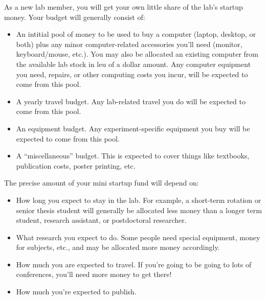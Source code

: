 \documentclass{tufte-book} %
\begin{document}
As a new lab member, you will get your own little share of the lab's
startup money.    Your budget will
generally consist of:
\begin{itemize}
\item An intitial pool of money to be used to buy a computer (laptop,
  desktop, or both) plus any minor computer-related accessories you'll
  need (monitor, keyboard/mouse, etc.).  You may also be allocated an
  existing computer from the available lab stock in leu of a dollar amount.  Any computer
  equipment you need, repairs, or other computing costs you incur,
  will be expected to come from this pool.
\item A yearly travel budget.  Any lab-related travel you do will be
  expected to come from this pool.
\item An equipment budget.  Any experiment-specific equipment you buy
  will be expected to come from this pool.
\item A ``miscellaneous'' budget.  This is expected to cover things
  like textbooks, publication costs, poster printing, etc.
\end{itemize}

The precise amount of your mini startup fund will depend on:
\begin{itemize}
\item How long you expect
to stay in the lab.  For example, a short-term rotation or senior thesis
student will generally be allocated less money than a longer term
student, research assistant, or postdoctoral researcher.
\item What research you expect to do.  Some people need special
  equipment, money for subjects, etc., and may be
  allocated more money accordingly.
\item How much you are expected to travel.  If you're going to be
  going to lots of conferences, you'll need more money to get there!
\item How much you're expected to publish.
\end{itemize}
\end{document}
